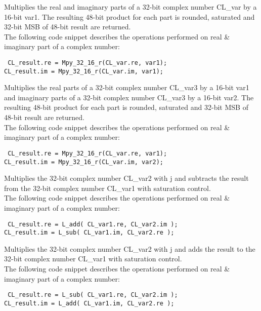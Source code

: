 Multiplies the real and imaginary parts of a 32-bit complex number CL\_var by a 16-bit var1.
The resulting 48-bit product for each part is rounded, saturated and 32-bit MSB of 48-bit result are returned.\\
The following code snippet describes the operations performed on real \& imaginary part of a complex number:

{\tt {} CL\_result.re = Mpy\_32\_16\_r(CL\_var.re, var1);\\
 CL\_result.im = Mpy\_32\_16\_r(CL\_var.im, var1);
}


Multiplies the real parts of a 32-bit complex number CL\_var3 by a 16-bit var1 and imaginary parts of a 32-bit complex number CL\_var3 by a 16-bit var2.
The resulting 48-bit product for each part is rounded, saturated and 32-bit MSB of 48-bit result are returned.\\
The following code snippet describes the operations performed on real \& imaginary part of a complex number:

{\tt {} CL\_result.re = Mpy\_32\_16\_r(CL\_var.re, var1);\\
 CL\_result.im = Mpy\_32\_16\_r(CL\_var.im, var2);
}


Multiplies the 32-bit complex number CL\_var2 with j and subtracts the result from the 32-bit complex number CL\_var1 with saturation control.\\
The following code snippet describes the operations performed on real \& imaginary part of a complex number:

{\tt {} CL\_result.re = L\_add( CL\_var1.re, CL\_var2.im );\\
 CL\_result.im = L\_sub( CL\_var1.im, CL\_var2.re );
}


Multiplies the 32-bit complex number CL\_var2 with j and adds the result to the 32-bit complex number CL\_var1 with saturation control.\\
The following code snippet describes the operations performed on real \& imaginary part of a complex number:

{\tt {} CL\_result.re = L\_sub( CL\_var1.re, CL\_var2.im );\\
 CL\_result.im = L\_add( CL\_var1.im, CL\_var2.re );
}

